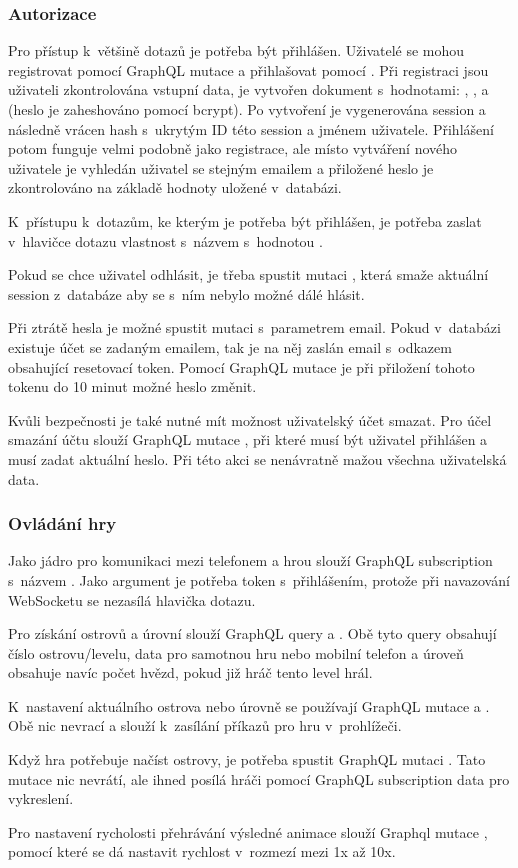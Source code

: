 \subsubsection{Autorizace}
Pro přístup k~většině dotazů je potřeba být přihlášen. Uživatelé se mohou registrovat pomocí GraphQL mutace  a přihlašovat pomocí . Při registraci jsou uživateli zkontrolována vstupní data, je vytvořen dokument s~hodnotami: , ,  a  (heslo je zaheshováno pomocí bcrypt\cite{bcrypt}). Po vytvoření je vygenerována session a následně vrácen hash s~ukrytým ID této session a jménem uživatele. Přihlášení potom funguje velmi podobně jako registrace, ale místo vytváření nového uživatele je vyhledán uživatel se stejným emailem a přiložené heslo je zkontrolováno na základě hodnoty uložené v~databázi.\par
K~přístupu k~dotazům, ke kterým je potřeba být přihlášen, je potřeba zaslat v~hlavičce dotazu vlastnost s~názvem  s~hodnotou .\par
Pokud se chce uživatel odhlásit, je třeba spustit mutaci , která smaže aktuální session z~databáze aby se s~ním nebylo možné dálé hlásit.\par
Při ztrátě hesla je možné spustit mutaci  s~parametrem email. Pokud v~databázi existuje účet se zadaným emailem, tak je na něj zaslán email s~odkazem obsahující resetovací token. Pomocí GraphQL mutace  je při přiložení tohoto tokenu do 10 minut možné heslo změnit.\par
Kvůli bezpečnosti je také nutné mít možnost uživatelský účet smazat. Pro účel smazání účtu slouží GraphQL mutace , při které musí být uživatel přihlášen a musí zadat aktuální heslo. Při této akci se nenávratně mažou všechna uživatelská data.

\subsubsection{Ovládání hry}
Jako jádro pro komunikaci mezi telefonem a hrou slouží GraphQL subscription s~názvem . Jako argument je potřeba token s~přihlášením, protože při navazování WebSocketu se nezasílá hlavička dotazu.\par
Pro získání ostrovů a úrovní slouží GraphQL query  a . Obě tyto query obsahují číslo ostrovu/levelu, data pro samotnou hru nebo mobilní telefon a úroveň obsahuje navíc počet hvězd, pokud již hráč tento level hrál.\par
K~nastavení aktuálního ostrova nebo úrovně se používají GraphQL mutace  a . Obě nic nevrací a slouží k~zasílání příkazů pro hru v~prohlížeči.\par
Když hra potřebuje načíst ostrovy, je potřeba spustit GraphQL mutaci . Tato mutace nic nevrátí, ale ihned posílá hráči pomocí GraphQL subscription data pro vykreslení.\par
Pro nastavení rycholosti přehrávání výsledné animace slouží Graphql mutace , pomocí které se dá nastavit rychlost v~rozmezí mezi 1x až 10x.

